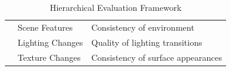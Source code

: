 \begin{table}[h]
\begin{tabular}{l|l|l}
                                                             & Scene Features                                & Consistency of environment                     \\
                                                             & Lighting Changes                              & Quality of lighting transitions                \\
                                                             & Texture Changes                               & Consistency of surface appearances             \\
        \bottomrule
    \end{tabular}
    \caption{Hierarchical Evaluation Framework}\label{tab:evaluation_metrics}
\end{table}
